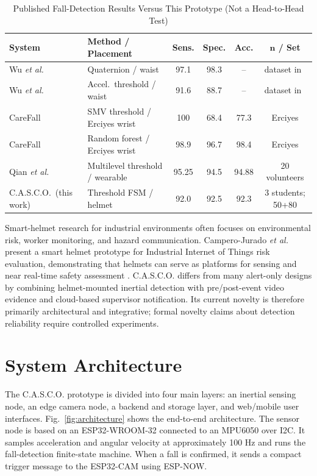 \documentclass[conference]{IEEEtran}
\begin{document}
\begin{table}[!t]
\caption{Published Fall-Detection Results Versus This Prototype (Not a Head-to-Head Test)}
\label{tab:lit}
\centering
\begin{tabular}{|l|l|c|c|c|c|}
\hline
\textbf{System} & \textbf{Method / Placement} & \textbf{Sens.} & \textbf{Spec.} & \textbf{Acc.} & \textbf{$\boldsymbol{n}$ / Set} \\
\hline
Wu \textit{et al.}~\cite{wu2015} & Quaternion / waist & 97.1 & 98.3 & -- & dataset in~\cite{wu2015} \\
\hline
Wu \textit{et al.}~\cite{wu2015} & Accel.\ threshold / waist & 91.6 & 88.7 & -- & dataset in~\cite{wu2015} \\
\hline
CareFall~\cite{ruizgarcia2023} & SMV threshold / Erciyes wrist & 100 & 68.4 & 77.3 & Erciyes \\
\hline
CareFall~\cite{ruizgarcia2023} & Random forest / Erciyes wrist & 98.9 & 96.7 & 98.4 & Erciyes \\
\hline
Qian \textit{et al.}~\cite{qian2022} & Multilevel threshold / wearable & 95.25 & 94.5 & 94.88 & 20 volunteers \\
\hline
C.A.S.C.O.\ (this work) & Threshold FSM / helmet & 92.0 & 92.5 & 92.3 & 3 students; 50+80 \\
\hline
\end{tabular}
\end{table}

Smart-helmet research for industrial environments often focuses on environmental risk, worker monitoring, and hazard communication. Campero-Jurado \textit{et al.} present a smart helmet prototype for Industrial Internet of Things risk evaluation, demonstrating that helmets can serve as platforms for sensing and near real-time safety assessment \cite{campero2020}. C.A.S.C.O. differs from many alert-only designs by combining helmet-mounted inertial detection with pre/post-event video evidence and cloud-based supervisor notification. Its current novelty is therefore primarily architectural and integrative; formal novelty claims about detection reliability require controlled experiments.

\section{System Architecture}
The C.A.S.C.O. prototype is divided into four main layers: an inertial sensing node, an edge camera node, a backend and storage layer, and web/mobile user interfaces. Fig.~\ref{fig:architecture} shows the end-to-end architecture. The sensor node is based on an ESP32-WROOM-32 connected to an MPU6050 over I2C. It samples acceleration and angular velocity at approximately 100 Hz and runs the fall-detection finite-state machine. When a fall is confirmed, it sends a compact trigger message to the ESP32-CAM using ESP-NOW.
\end{document}
